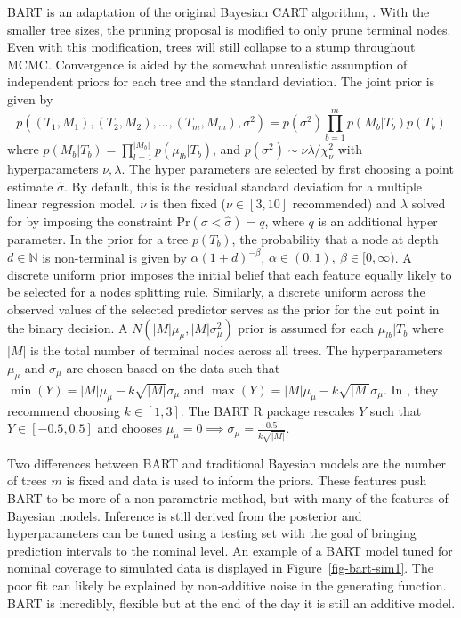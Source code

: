 \documentclass[
  12pt,
  letterpaper,
  DIV=11,
  numbers=noendperiod]{scrartcl}
\begin{document}
BART is an adaptation of the original Bayesian CART algorithm,
\citep{bayes_cart}. With the smaller tree sizes, the pruning proposal is
modified to only prune terminal nodes. Even with this modification,
trees will still collapse to a stump throughout MCMC. Convergence is
aided by the somewhat unrealistic assumption of independent priors for
each tree and the standard deviation. The joint prior is given by
\[p((T_1, M_1), (T_2, M_2),...,(T_m, M_m),\sigma^2)=p(\sigma^2)\prod_{b=1}^mp(M_b|T_b)p(T_b)\]
where \(p(M_b|T_b)=\prod_{l=1}^{|M_b|}p(\mu_{lb}|T_b)\), and
\(p(\sigma^2)\sim\nu\lambda/\chi^2_\nu\) with hyperparameters
\(\nu,\lambda\). The hyper parameters are selected by first choosing a
point estimate \(\hat\sigma\). By default, this is the residual standard
deviation for a multiple linear regression model. \(\nu\) is then fixed
(\(\nu\in[3,10]\) recommended) and \(\lambda\) solved for by imposing
the constraint \(\text{Pr}(\sigma<\hat\sigma)=q\), where \(q\) is an
additional hyper parameter. In the prior for a tree \(p(T_b)\), the
probability that a node at depth \(d\in\mathbb{N}\) is non-terminal is
given by \(\alpha(1+d)^{-\beta}\),
\(\alpha\in(0,1),\ \beta\in[0,\infty)\). A discrete uniform prior
imposes the initial belief that each feature equally likely to be
selected for a nodes splitting rule. Similarly, a discrete uniform
across the observed values of the selected predictor serves as the prior
for the cut point in the binary decision. A
\(N(|M|\mu_\mu,|M|\sigma^2_\mu)\) prior is assumed for each
\(\mu_{lb}|T_b\) where \(|M|\) is the total number of terminal nodes
across all trees. The hyperparameters \(\mu_\mu\) and \(\sigma_\mu\) are
chosen based on the data such that
\(\min(Y)=|M|\mu_\mu-k\sqrt{|M|}\sigma_\mu\) and
\(\max(Y)=|M|\mu_\mu-k\sqrt{|M|}\sigma_\mu\). In \citep{bart_paper},
they recommend choosing \(k\in[1,3]\). The BART R package \citep{bart_r}
rescales \(Y\) such that \(Y\in[-0.5, 0.5]\) and chooses
\(\mu_\mu=0\implies\sigma_\mu=\frac{0.5}{k\sqrt{|M|}}\).

Two differences between BART and traditional Bayesian models are the
number of trees \(m\) is fixed and data is used to inform the priors.
These features push BART to be more of a non-parametric method, but with
many of the features of Bayesian models. Inference is still derived from
the posterior and hyperparameters can be tuned using a testing set with
the goal of bringing prediction intervals to the nominal level. An
example of a BART model tuned for nominal coverage to simulated data is
displayed in Figure~\ref{fig-bart-sim1}. The poor fit can likely be
explained by non-additive noise in the generating function. BART is
incredibly, flexible but at the end of the day it is still an additive
model.
\end{document}
